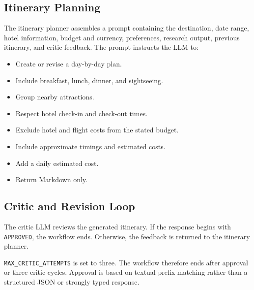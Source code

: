\documentclass[12pt,a4paper]{report}
\begin{document}
\subsection{Itinerary Planning}
\label{subsec:itinerary-planning}
The itinerary planner assembles a prompt containing the destination, date range, hotel information,
budget and currency, preferences, research output, previous itinerary, and critic feedback.
The prompt instructs the LLM to:
\begin{itemize}
    \item Create or revise a day-by-day plan.
    \item Include breakfast, lunch, dinner, and sightseeing.
    \item Group nearby attractions.
    \item Respect hotel check-in and check-out times.
    \item Exclude hotel and flight costs from the stated budget.
    \item Include approximate timings and estimated costs.
    \item Add a daily estimated cost.
    \item Return Markdown only.
\end{itemize}

\subsection{Critic and Revision Loop}
\label{subsec:critic-loop}
The critic LLM reviews the generated itinerary. If the response begins with \texttt{APPROVED},
the workflow ends. Otherwise, the feedback is returned to the itinerary planner.

\texttt{MAX\_CRITIC\_ATTEMPTS} is set to three. The workflow therefore ends after approval or
three critic cycles. Approval is based on textual prefix matching rather than a structured JSON
or strongly typed response.
\end{document}
